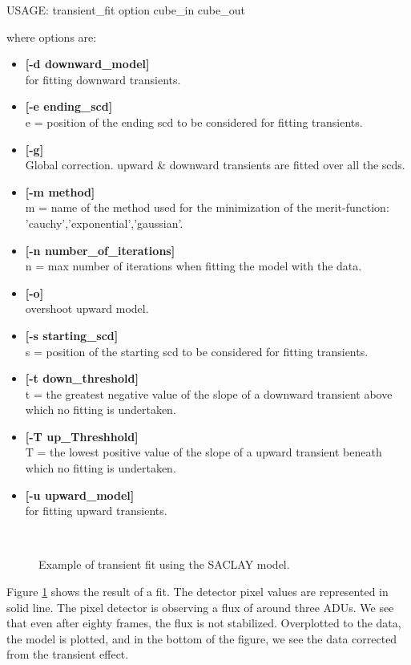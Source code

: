 \begin{center}
 USAGE: transient\_fit option cube\_in cube\_out
\end{center}
where options are:
\begin{itemize}
\item {\bf [-d downward\_model]} \\
for fitting downward transients.
\item {\bf [-e ending\_scd]} \\
e = position of the ending scd to be considered  for fitting transients.
\item {\bf [-g]} \\
Global correction. upward \& downward transients are fitted over all the scds.
 \item {\bf [-m method]} \\
m = name of the method used for the minimization of the merit-function:
'cauchy','exponential','gaussian'.
\item {\bf [-n number\_of\_iterations]} \\
n = max number of iterations when fitting the model with the data.
\item {\bf [-o]} \\
overshoot upward model.
\item {\bf [-s starting\_scd]} \\
s = position of the starting scd to be considered  for fitting transients.
\item {\bf [-t down\_threshold]} \\
t = the greatest negative value of the slope of a downward transient above 
which   no fitting is undertaken.
\item {\bf [-T up\_Threshhold]} \\
T = the lowest positive value of the slope of a upward transient beneath
 which no fitting is undertaken.
\item {\bf [-u upward\_model]} \\
for fitting upward transients.
\end{itemize}

\begin{figure}[htb]
\centerline{
\hbox{
}}
\caption{Example of transient fit using the SACLAY model.}
\label{fig_trans_cea1}
\end{figure}

Figure \ref{fig_trans_cea1} shows the result of a fit. The detector pixel values  
  are represented in solid line. The pixel detector is observing
a flux of around three ADUs. We see that even after
eighty frames, the flux is not stabilized. Overplotted to the data, the 
model is plotted, and in the bottom of the figure, we see the data corrected
from the transient effect.
\clearpage

